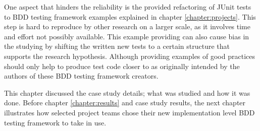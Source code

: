 One aspect that hinders the reliability is the provided refactoring of JUnit tests to BDD testing framework examples explained
in chapter \ref{chapter:projects}. This step is hard to reproduce by other research on a larger scale, as it involves time and effort not
possibly available. This example providing can also cause bias in the studying by
shifting the written new tests to a certain structure that supports the research hypothesis. Although providing examples
of good practices should only help to produce test code closer to as originally intended by the authors of these BDD testing framework creators.

This chapter discussed the case study details; what was studied and how it was done. Before chapter \ref{chapter:results} and case study results,
the next chapter illustrates how selected project teams chose their new implementation level BDD testing framework to take in use.



